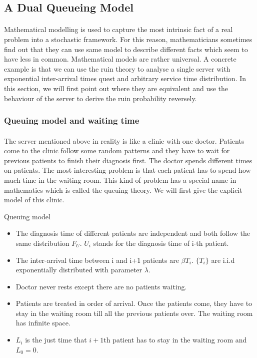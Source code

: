 \documentclass[project2.tex]{subfiles}
\begin{document}
\subsection{A Dual Queueing Model}
\paragraph{}
Mathematical modelling is used to capture the most intrinsic fact of a real problem into a stochastic framework. For this reason, mathematicians sometimes find out that they can use same model to describe different facts which seem to have less in common. Mathematical models are rather universal. A concrete example is that we can use the ruin theory to analyse a single server with exponential inter-arrival times quest and arbitrary service time distribution. In this section, we will first point out  where they are equivalent and use the behaviour of the server to derive the ruin probability reversely.
\subsubsection{Queuing model and waiting time}
\paragraph{}
The server mentioned above in reality is like a clinic with one doctor. Patients come to the clinic follow some random patterns and they have to wait for previous patients to finish their diagnosis first. The doctor spends different times on patients. The most interesting problem is that each patient has to spend how much time in the waiting room. This kind of problem has a special name in mathematics which is called the queuing theory. We will first give the explicit model of this clinic.
\begin{definition}
Queuing model
\end{definition}
\begin{itemize}
\item The diagnosis time of different patients are independent and both follow the same distribution $F_U$. $U_i$ stands for the diagnosis time of i-th patient.
\item The inter-arrival time between i and i+1 patients are $\beta T_i$. $\{T_i\}$ are i.i.d exponentially distributed with parameter $\lambda$.
\item Doctor never rests except there are no patients waiting.
\item Patients are treated in order of arrival. Once the patients come, they have to stay in the waiting room till all the previous patients over. The waiting room has infinite space.   
\item $L_i$ is the just time that $i+1$th patient has to stay in the waiting room and $L_0=0$. 
\end{itemize}
\end{document}
